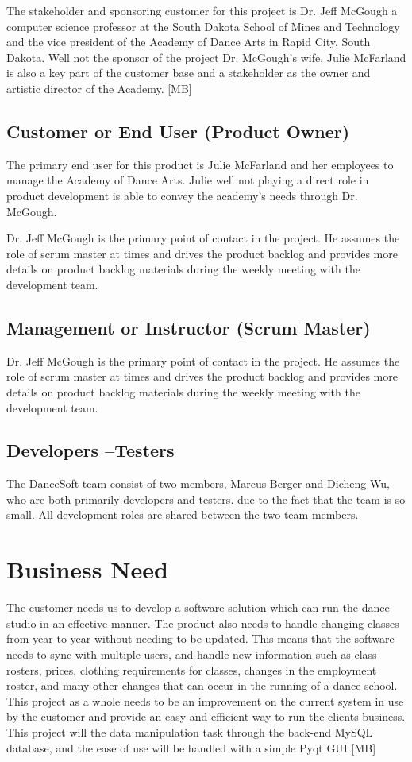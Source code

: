 The stakeholder and sponsoring customer for this project is Dr. Jeff McGough a computer science professor at the South Dakota School of Mines and Technology and the vice president of the Academy of Dance Arts in Rapid City, South Dakota.
Well not the sponsor of the project Dr. McGough's wife, Julie McFarland is also a key part of the customer base and a stakeholder as the owner and artistic director of the Academy. [MB] 


\subsection{Customer or End User (Product Owner)}
The primary end user for this product is Julie McFarland and her employees to manage the Academy of Dance Arts. Julie well not playing a direct role in product development is able to convey the academy's needs through Dr. McGough.

Dr. Jeff McGough is the primary point of contact in the project. He assumes the role of scrum master at times and drives the product backlog and provides more details on product backlog materials during the weekly meeting with the development team. 

\subsection{Management or Instructor (Scrum Master)}
Dr. Jeff McGough is the primary point of contact in the project. He assumes the role of scrum master at times and drives the product backlog and provides more details on product backlog materials during the weekly meeting with the development team.


\subsection{Developers --Testers}
The DanceSoft team consist of two members, Marcus Berger and Dicheng Wu, who are both primarily developers and testers. due to the fact that the team is so small. All development roles are shared between the two team members.


\section{Business Need}
The customer needs us to develop a software solution which can run the dance studio in an effective manner. The product also needs to handle changing classes from year to year without needing to be updated. This means that the software needs to sync with multiple users, and handle new information such as class rosters, prices, clothing requirements for classes, changes in the employment roster, and many other changes that can occur in the running of a dance school.\\
This project as a whole needs to be an improvement on the current system in use by the customer and provide an easy and efficient way to run the clients business. This project will  the data manipulation task through the back-end MySQL database, and the ease of use will be handled with a simple Pyqt GUI [MB]

